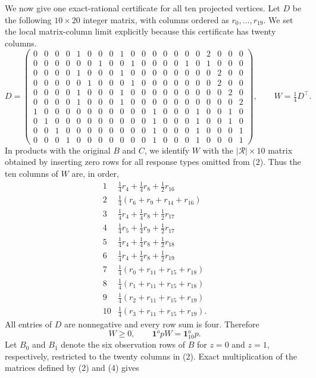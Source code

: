 We now give one exact-rational certificate for all ten projected vertices.  Let \(D\) be the following \(10\times20\) integer matrix, with columns ordered as \(r_0,\ldots,r_{19}\).  We set the local matrix-column limit explicitly because this certificate has twenty columns.
\setcounter{MaxMatrixCols}{20}
{\scriptsize
\[
D=
\begin{pmatrix}
0&0&0&0&1&0&0&0&1&0&0&0&0&0&0&0&2&0&0&0\\
0&0&0&0&0&0&1&0&0&1&0&0&0&0&1&0&1&0&0&0\\
0&0&0&0&1&0&0&0&1&0&0&0&0&0&0&0&0&2&0&0\\
0&0&0&0&0&1&0&0&0&1&0&0&0&0&0&0&0&2&0&0\\
0&0&0&0&1&0&0&0&1&0&0&0&0&0&0&0&0&0&2&0\\
0&0&0&0&1&0&0&0&1&0&0&0&0&0&0&0&0&0&0&2\\
1&0&0&0&0&0&0&0&0&0&0&1&0&0&0&1&0&0&1&0\\
0&1&0&0&0&0&0&0&0&0&0&1&0&0&0&1&0&0&1&0\\
0&0&1&0&0&0&0&0&0&0&0&1&0&0&0&1&0&0&0&1\\
0&0&0&1&0&0&0&0&0&0&0&1&0&0&0&1&0&0&0&1
\end{pmatrix},
\qquad W=\tfrac14D^\top.
\tag{4}
\]
}
In products with the original \(B\) and \(C\), we identify \(W\) with the \(|\mathcal R|\times10\) matrix obtained by inserting zero rows for all response types omitted from (2).
Thus the ten columns of \(W\) are, in order,
\[
\begin{array}{c|l}
1&\tfrac14r_4+\tfrac14r_8+\tfrac12r_{16}\\
2&\tfrac14(r_6+r_9+r_{14}+r_{16})\\
3&\tfrac14r_4+\tfrac14r_8+\tfrac12r_{17}\\
4&\tfrac14r_5+\tfrac14r_9+\tfrac12r_{17}\\
5&\tfrac14r_4+\tfrac14r_8+\tfrac12r_{18}\\
6&\tfrac14r_4+\tfrac14r_8+\tfrac12r_{19}\\
7&\tfrac14(r_0+r_{11}+r_{15}+r_{18})\\
8&\tfrac14(r_1+r_{11}+r_{15}+r_{18})\\
9&\tfrac14(r_2+r_{11}+r_{15}+r_{19})\\
10&\tfrac14(r_3+r_{11}+r_{15}+r_{19}).
\end{array}
\tag{5}
\]
All entries of \(D\) are nonnegative and every row sum is four.  Therefore
\[
 W\geq0,
 \qquad
 \mathbf 1^	op W=\mathbf 1_{10}^	op.
 \tag{6}
\]
Let \(B_0\) and \(B_1\) denote the six observation rows of \(B\) for \(z=0\) and \(z=1\), respectively, restricted to the twenty columns in (2).  Exact multiplication of the matrices defined by (2) and (4) gives
